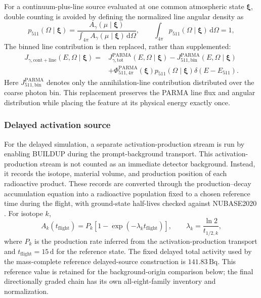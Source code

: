 \documentclass[11pt]{article}
\begin{document}
For a continuum-plus-line source evaluated at one common atmospheric state
$\boldsymbol{\xi}$, double counting is avoided by defining the normalized line
angular density as
\begin{equation}
  p_{511}(\Omega\mid\boldsymbol{\xi})=
  \frac{A_\gamma(\mu\mid\boldsymbol{\xi})}
       {\int_{4\pi}A_\gamma(\mu\mid\boldsymbol{\xi})\,\mathrm{d}\Omega},
  \qquad
  \int_{4\pi}p_{511}(\Omega\mid\boldsymbol{\xi})\,\mathrm{d}\Omega=1,
  \label{eq:atm511_angular_pdf}
\end{equation}
The binned line contribution is then replaced, rather than supplemented:
\begin{equation}
  \begin{aligned}
  J_{\gamma,\mathrm{cont+line}}(E,\Omega\mid\boldsymbol{\xi})={}&
  J_{\gamma,\mathrm{tot}}^{\mathrm{PARMA}}(E,\Omega\mid\boldsymbol{\xi})
  -J_{511,\mathrm{bin}}^{\mathrm{PARMA}}(E,\Omega\mid\boldsymbol{\xi}) \\
  &+\Phi_{511,4\pi}^{\mathrm{PARMA}}(\boldsymbol{\xi})
   p_{511}(\Omega\mid\boldsymbol{\xi})\delta(E-E_{511}).
  \end{aligned}
  \label{eq:atm511_single_count}
\end{equation}
Here $J_{511,\mathrm{bin}}^{\mathrm{PARMA}}$ denotes only the annihilation-line
contribution distributed over the coarse photon bin. This replacement preserves
the PARMA line flux and angular distribution while placing the feature at its
physical energy exactly once.

\subsubsection{Delayed activation source}
\label{subsec:delayed_source}

For the delayed simulation, a separate activation-production stream is run by
enabling BUILDUP during the prompt-background transport. This
activation-production stream is not counted as an immediate detector background.
Instead, it records the isotope, material volume, and production position of
each radioactive product. These records are converted through the
production--decay accumulation equation into a radioactive population fixed to a
chosen reference time during the flight, with ground-state half-lives checked
against NUBASE2020 \cite{Kondev2021NUBASE}. For isotope $k$,
\begin{equation}
  A_k(t_{\mathrm{flight}}) = P_k\left[1-\exp\left(-\lambda_k t_{\mathrm{flight}}\right)\right],
  \qquad \lambda_k = \frac{\ln 2}{t_{1/2,k}},
\end{equation}
where $P_k$ is the production rate inferred from the activation-production
transport and $t_{\mathrm{flight}}=15\,\mathrm{d}$ for the reference state.
The fixed delayed total activity used by the mass-complete reference
delayed-source construction is $141.83\,\mathrm{Bq}$. This reference value is
retained for the background-origin comparison below; the final directionally graded chain has
its own all-eight-family inventory and normalization.
\end{document}
